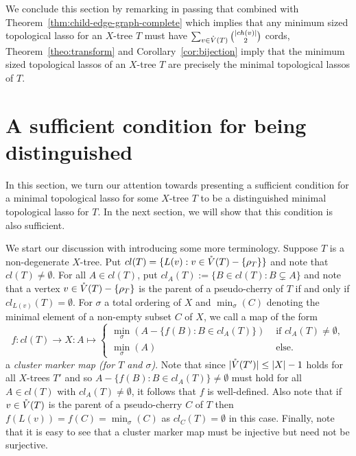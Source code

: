 We conclude this section by remarking in passing that combined with
Theorem~\ref{thm:child-edge-graph-complete} which implies that any minimum
sized topological lasso for an $X$-tree $T$ must have $\sum_{v\in
  \mathring{V}(T)}{|ch(v)|\choose 2}$ cords, Theorem~\ref{theo:transform} and
Corollary~\ref{cor:bijection} imply that the minimum sized topological lassos
of an $X$-tree $T$ are precisely the minimal topological lassos of $T$.
 
\section{A sufficient condition for being distinguished}
\label{sec:sufficient}
In this section, we turn our attention towards presenting a sufficient
condition for a minimal topological lasso for some $X$-tree $T$ to be a
distinguished minimal topological lasso for $T$.  In the next section, we will
show that this condition is also sufficient.

We start our discussion with introducing some more terminology.  Suppose $T$
is a non-degenerate $X$-tree. Put $cl(T)=\{L(v): v\in \mathring{V}(T)-\{\rho_T\}\}$ and
note that $cl(T)\not=\emptyset$. For all $A\in cl(T)$, put $cl_A(T):=\{B\in
cl(T): B\subsetneq A\}$ and note that a vertex $v\in \mathring{V}(T)-\{\rho_T\}$ is the
parent of a pseudo-cherry of $T$ if and only if $cl_{L(v)}(T)=\emptyset$.  For
$\sigma$ a total ordering of $X$ and $\min_{\sigma}(C)$ denoting the minimal
element of a non-empty subset $C$ of $X$, we call a map of the form
$$
f:cl(T)\to X:
A\mapsto \left\{\begin{array}{cc}
\min_{\sigma}(A-\{f(B): B\in cl_A(T)\})
 & \mbox{ if }cl_A(T)\not=\emptyset,\\
\min_{\sigma}(A)  & \mbox{ else. }
\end{array}
\right.
$$ 
a {\em cluster marker map (for $T$ and $\sigma$)}.  Note that since
$|\mathring{V}(T')|\leq |X|-1$ holds for all $X$-trees $T'$ and so $A-\{f(B): B\in
cl_A(T)\}\not=\emptyset$ must hold for all $A\in cl(T)$ with
$cl_A(T)\not=\emptyset $, it follows that $f$ is well-defined.  Also note that
if $v\in \mathring{V}(T)$ is the parent of a pseudo-cherry $C$ of $T$ then
$f(L(v))=f(C)= \min_{\sigma}(C)$ as $cl_C(T)=\emptyset$ in this case. Finally,
note that it is easy to see that a cluster marker map must be injective but
need not be surjective.


